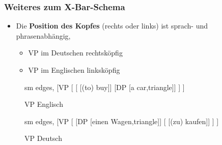 \begin{frame}
\frametitle{Weiteres zum X-Bar-Schema}

	\begin{itemize}
		\item Die \textbf{Position des Kopfes} (rechts oder links) ist sprach- und phrasenabhängig,
		\begin{itemize}
			\item VP im Deutschen \ras rechtsköpfig
			\item VP im Englischen \ras linksköpfig			
		\end{itemize}
	\end{itemize}
	
\begin{figure}[b]
  	\begin{minipage}[b]{0.45\textwidth}
	\centering
	\footnotesize{
		\begin{forest}
		sm edges,
		[VP	[
					[\alert{} [(to) buy]]
					[DP [a car,triangle]]
			]
		]
		\end{forest}
		}
		\caption{VP Englisch}
  	\end{minipage}  
	\begin{minipage}[b]{0.45\textwidth}
	\centering
	\footnotesize{
		\begin{forest}
		sm edges,
		[VP	[\MyPxbar{V}
					[DP [einen Wagen,triangle]]
					[\alert{} [(zu) kaufen]]					
			]
		]
		\end{forest}
		}
		\caption{VP Deutsch}
  	\end{minipage}  
\end{figure}

\end{frame}


